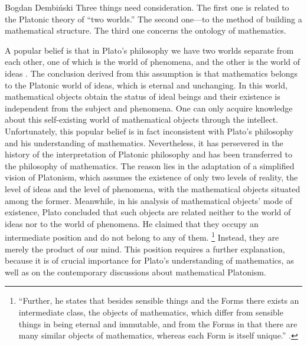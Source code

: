 \begin{artengenv}{Bogdan Dembiński}
Three things need consideration. The first one is related to the Platonic theory of ``two
worlds.'' The second one---to the method of building a mathematical structure. The third one
concerns the ontology of mathematics.

A popular belief is that in Plato’s philosophy we have two worlds separate from each other, one of which is the world
of phenomena, and the other is the world of ideas
\parencite{dembinski_streit_2007}.
The conclusion derived
from this assumption is that mathematics belongs to the Platonic world of ideas, which is eternal and unchanging. In
this world, mathematical objects obtain the status of ideal beings and their existence is independent from the
subject and phenomena. One can only acquire knowledge about this self-existing world of mathematical objects through
the intellect. Unfortunately, this popular belief is in fact inconsistent with Plato’s philosophy and his understanding
of mathematics. Nevertheless, it has persevered in the history of the interpretation of Platonic philosophy and
has been transferred to the philosophy of mathematics. The reason lies in the adaptation of a simplified
vision of Platonism, which assumes the existence of only two levels of reality, the level of ideas and the level of
phenomena, with the mathematical objects situated among the former. Meanwhile, in his analysis of mathematical objects'
mode of existence, Plato concluded that such objects are related neither to the world of ideas nor to the world of
phenomena. He claimed that they occupy an intermediate position and do not belong to any of them.
\footnote{``Further, he states that besides sensible things and the Forms there exists an intermediate class,
the objects of mathematics, which differ from sensible things in being eternal and immutable,
and from the Forms in that there
are many similar objects of mathematics, whereas each Form is itself unique.''
\parencite[987b]{aristotle_aristotles_1924}.
}
Instead, they are merely the product of our mind. This position requires a further explanation, because it is of
crucial importance for Plato’s understanding of mathematics, as well as on the contemporary discussions about
mathematical Platonism.


\end{artengenv}
